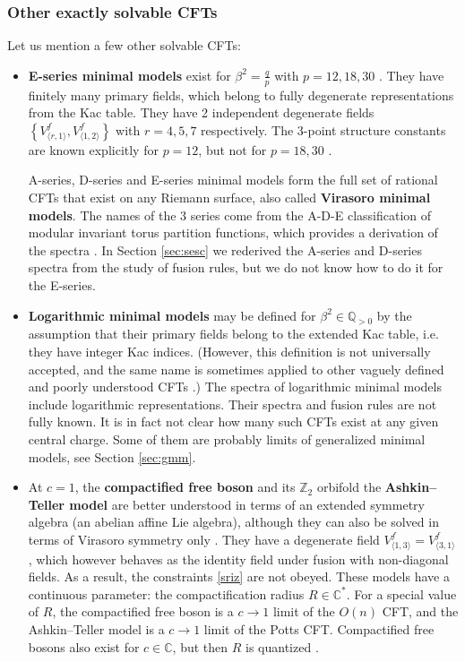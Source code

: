 \documentclass[12pt, a4paper]{article}
\newcommand{\myindex}[1]{\textbf{\boldmath #1}}
\begin{document}
\subsubsection{Other exactly solvable CFTs}

Let us mention a few other solvable CFTs:
\begin{itemize}
 \item \myindex{E-series minimal models} exist for $\beta^2=\frac{q}{p}$ with $p=12, 18, 30$ \cite{fms97}. They have finitely many primary fields, which belong to fully degenerate representations from the Kac table. 
They have 2 independent degenerate fields $\left\{V^f_{\langle r,1\rangle},V^f_{\langle 1,2\rangle}\right\}$ with $r=4,5,7$ respectively.
The 3-point structure constants are known explicitly for $p=12$, but not for $p=18,30$ \cite{nr25}.

A-series, D-series and E-series minimal models form the full set of rational CFTs that exist on any Riemann surface, also called \myindex{Virasoro minimal models}. The names of the 3 series come from the A-D-E classification of modular invariant torus partition functions, which provides a derivation of the spectra \cite{cz09}. In Section \ref{sec:sesc} we rederived the A-series and D-series spectra from the study of fusion rules, but we do not know how to do it for the E-series.

\item \myindex{Logarithmic minimal models} may be defined for $\beta^2\in \mathbb{Q}_{>0}$ by the assumption that their primary fields belong to the extended Kac table, i.e. they have integer Kac indices. (However, this definition is not universally accepted, and the same name is sometimes applied to other vaguely defined and poorly understood CFTs \cite{prz06}.) The spectra of logarithmic minimal models include logarithmic representations. Their spectra and fusion rules are not fully known. It is in fact not clear how many such CFTs exist at any given central charge. Some of them are probably limits of generalized minimal models, see Section \ref{sec:gmm}.

\item At $c=1$, the \myindex{compactified free boson} and its $\mathbb{Z}_2$ orbifold the \myindex{Ashkin--Teller model} are better understood in terms of an extended symmetry algebra (an abelian affine Lie algebra), although they can also be solved in terms of Virasoro symmetry only \cite{nr21}. They have a degenerate field $V^f_{\langle 1, 3\rangle}=V^f_{\langle 3,1\rangle}$, which however behaves as the identity field under fusion with non-diagonal fields. As a result, the constraints \eqref{sriz} are not obeyed. These models have a continuous parameter: the compactification radius $R\in\mathbb{C}^*$. For a special value of $R$, the compactified free boson is a $c\to 1$ limit of the $O(n)$ CFT, and the Ashkin--Teller model is a $c\to 1$ limit of the Potts CFT. Compactified free bosons also exist for $c\in\mathbb{C}$, but then $R$ is quantized \cite{rib14}. 
\end{itemize}
\end{document}
